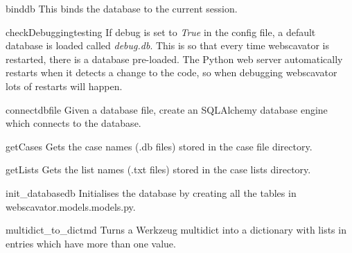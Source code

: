 \documentclass[letterpaper,10pt,english]{manual}
\begin{document}
\hypertarget{webscavator.utils.utils.bind}{}\begin{funcdesc}{bind}{db}
This binds the database to the current session.
\end{funcdesc}

\hypertarget{webscavator.utils.utils.checkDebugging}{}\begin{funcdesc}{checkDebugging}{testing}
If debug is set to \emph{True} in the config file, a default database is loaded called \emph{debug.db}. 
This is so that every time webscavator is restarted, there is a database pre-loaded. 
The Python web server automatically restarts when it detects a change to the code, 
so when debugging webscavator lots of restarts will happen.
\end{funcdesc}

\hypertarget{webscavator.utils.utils.connect}{}\begin{funcdesc}{connect}{dbfile}
Given a database file, create an SQLAlchemy database engine which connects to the database.
\end{funcdesc}

\hypertarget{webscavator.utils.utils.getCases}{}\begin{funcdesc}{getCases}{}
Gets the case names (.db files) stored in the case file directory.
\end{funcdesc}

\hypertarget{webscavator.utils.utils.getLists}{}\begin{funcdesc}{getLists}{}
Gets the list names (.txt files) stored in the case lists directory.
\end{funcdesc}

\hypertarget{webscavator.utils.utils.init_database}{}\begin{funcdesc}{init\_database}{db}
Initialises the database by creating all the tables in webscavator.models.models.py.
\end{funcdesc}

\hypertarget{webscavator.utils.utils.multidict_to_dict}{}\begin{funcdesc}{multidict\_to\_dict}{md}
Turns a Werkzeug multidict into a dictionary with lists in entries which have 
more than one value.
\end{funcdesc}
\end{document}
